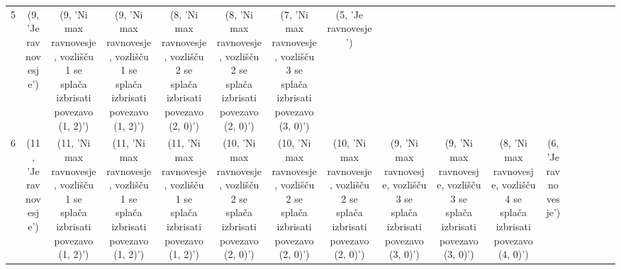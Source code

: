 \documentclass[fin1, tisk]{fmfdelo}
\begin{document}
\begin{table}[h]
{\begin{tabular}{|c|*{16}{c|}}
            5 & (9, 'Je ravnovesje')  & (9, 'Ni max ravnovesje, vozlišču 1 se splača izbrisati povezavo (1, 2)')  & (9, 'Ni max ravnovesje, vozlišču 1 se splača izbrisati povezavo (1, 2)')  & (8, 'Ni max ravnovesje, vozlišču 2 se splača izbrisati povezavo (2, 0)')  & (8, 'Ni max ravnovesje, vozlišču 2 se splača izbrisati povezavo (2, 0)')  & (7, 'Ni max ravnovesje, vozlišču 3 se splača izbrisati povezavo (3, 0)')  & (5, 'Je ravnovesje')                                                      &                                                                           &                                                                           &                                                                           &                                                                           &                                                                           &                                                                           &                                                                           &                                                                          &                      \\
            6 & (11, 'Je ravnovesje') & (11, 'Ni max ravnovesje, vozlišču 1 se splača izbrisati povezavo (1, 2)') & (11, 'Ni max ravnovesje, vozlišču 1 se splača izbrisati povezavo (1, 2)') & (11, 'Ni max ravnovesje, vozlišču 1 se splača izbrisati povezavo (1, 2)') & (10, 'Ni max ravnovesje, vozlišču 2 se splača izbrisati povezavo (2, 0)') & (10, 'Ni max ravnovesje, vozlišču 2 se splača izbrisati povezavo (2, 0)') & (10, 'Ni max ravnovesje, vozlišču 2 se splača izbrisati povezavo (2, 0)') & (9, 'Ni max ravnovesje, vozlišču 3 se splača izbrisati povezavo (3, 0)')  & (9, 'Ni max ravnovesje, vozlišču 3 se splača izbrisati povezavo (3, 0)')  & (8, 'Ni max ravnovesje, vozlišču 4 se splača izbrisati povezavo (4, 0)')  & (6, 'Je ravnovesje')                                                      &                                                                           &                                                                           &                                                                           &                                                                          &                      \\

\end{tabular}}
\end{table}
\end{document}
